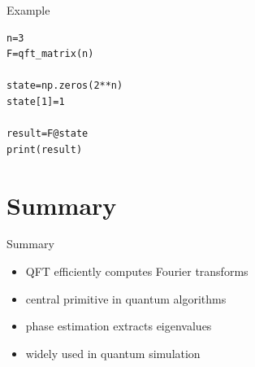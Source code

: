 \documentclass{beamer}
\begin{document}

\begin{frame}[fragile]{Example}

\begin{lstlisting}
n=3
F=qft_matrix(n)

state=np.zeros(2**n)
state[1]=1

result=F@state
print(result)
\end{lstlisting}

\end{frame}

\section{Summary}

\begin{frame}{Summary}

\begin{itemize}
\item QFT efficiently computes Fourier transforms
\item central primitive in quantum algorithms
\item phase estimation extracts eigenvalues
\item widely used in quantum simulation
\end{itemize}

\end{frame}
\end{document}
